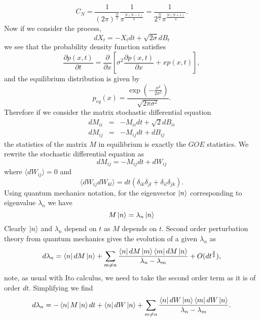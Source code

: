 \documentclass[11pt]{report}
\begin{document}
\begin{equation}
C_N = \frac{1}{(2\pi)^{\frac{N}{2}}}\frac{1}{\pi^{\frac{N(N-1)}{4}}} = \frac{1}{2^{\frac{N}{2}}\pi^{\frac{N(N+1)}{4}}}.
\end{equation}
Now if we consider the process,
\begin{equation}
dX_t = -X_t dt +\sqrt{2\sigma} dB_t
\end{equation}
we see that the probability density function satisfies
\begin{equation}
\frac{\partial  p(x,t)}{\partial t} =\frac{\partial}{\partial x}[\sigma^2 \frac{\partial  p(x,t)}{\partial x} + x p(x,t)],
\end{equation}
and the equilibrium distribution is given by
\begin{equation}
p_{eq}(x) = \frac{\exp(-\frac{x^2}{2\sigma^2})}{\sqrt{2\pi\sigma^2}}.
\end{equation}
Therefore if we consider the matrix stochastic differential equation
\begin{eqnarray}
dM_{ii} &=& -M_{ii} dt+ \sqrt{2} dB_{ii} \\
dM_{ij} &=& -M_{ij} dt +  dB_{ij}
\end{eqnarray}
the statistics of the matrix $M$ in equilibrium is exactly the $GOE$ statistics.
We rewrite the stochastic differential equation as
\begin{equation}
dM_{ij} = -M_{ij}dt + dW_{ij}
\end{equation}
where $\langle dW_{ij}\rangle=0$ and 
\begin{equation}
\langle dW_{ij}dW_{kl}\rangle = dt(\delta_{ik}\delta_{jl}+\delta_{il}\delta_{jk}).
\end{equation}
Using quantum mechanics notation, for the eigenvector $\ket{n}$ corresponding to eigenvalue $\lambda_n$ we have 
\begin{equation}
M\ket{n} =\lambda_n\ket{n}
\end{equation}
Clearly $\ket{n}$ and $\lambda_n$ depend on $t$ as $M$ depends on $t$.
Second order perturbation theory from quantum mechanics gives the evolution of a given $\lambda_n$ as 
\begin{equation}
d\lambda_n = \bra{n} dM\ket{n} + \sum_{m\neq n} \frac{\bra{n} dM\ket{m}\bra{m} dM\ket{n}}{\lambda_n-\lambda_m} +O(dt^{\frac{3}{2}}),
\end{equation}
note, as usual with Ito calculus,  we need to take the second order term as it is of order $dt$. Simplifying we find
\begin{equation}
d\lambda_n = -\bra{n} M\ket{n} dt +\bra{n} dW\ket{n} + \sum_{m\neq n} \frac{\bra{n} dW\ket{m}\bra{m} dW\ket{n}}{\lambda_n-\lambda_m} .
\end{equation}
\end{document}
